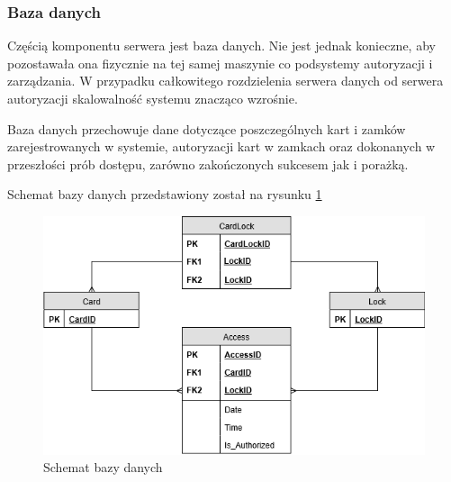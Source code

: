                         \subsubsection{Baza danych}
                                Częścią komponentu serwera jest baza danych. Nie jest jednak konieczne, aby pozostawała ona fizycznie na tej samej maszynie co podsystemy autoryzacji i zarządzania. W przypadku całkowitego rozdzielenia serwera danych od serwera autoryzacji skalowalność systemu znacząco wzrośnie.

                                Baza danych przechowuje dane dotyczące poszczególnych kart i zamków zarejestrowanych w systemie, autoryzacji kart w zamkach oraz dokonanych w przeszłości prób dostępu, zarówno zakończonych sukcesem jak i porażką.

                                Schemat bazy danych przedstawiony został na rysunku \ref{fig:schema}

                                \begin{figure}
                                        \includegraphics[width=\linewidth]{chapters/images/schema.png}
                                        \caption{Schemat bazy danych}
                                        \label{fig:schema}
                                \end{figure}

